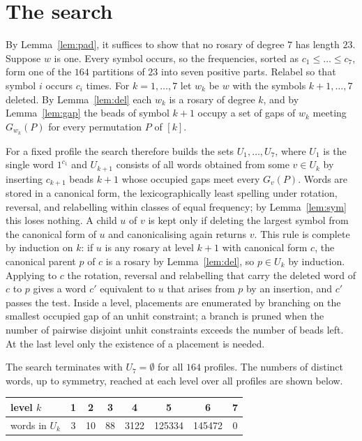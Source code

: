\documentclass[a4paper,11pt]{amsart}
\theoremstyle{remark}
\begin{document}
\section{The search}\label{sec:search}

By Lemma~\ref{lem:pad}, it suffices to show that no rosary of degree $7$ has
length $23$.  Suppose $w$ is one.  Every symbol occurs, so the frequencies,
sorted as $c_1\le\dots\le c_7$, form one of the $164$ partitions of $23$ into
seven positive parts.  Relabel so that symbol $i$ occurs $c_i$ times.  For
$k=1,\dots,7$ let $w_k$ be $w$ with the symbols $k+1,\dots,7$ deleted.  By
Lemma~\ref{lem:del} each $w_k$ is a rosary of degree $k$, and by
Lemma~\ref{lem:gap} the beads of symbol $k+1$ occupy a set of gaps of $w_k$
meeting $G_{w_k}(P)$ for every permutation $P$ of $[k]$.

For a fixed profile the search therefore builds the sets $U_1,\dots,U_7$,
where $U_1$ is the single word $1^{c_1}$ and $U_{k+1}$ consists of all words
obtained from some $v\in U_k$ by inserting $c_{k+1}$ beads $k+1$ whose
occupied gaps meet every $G_v(P)$.  Words are stored in a canonical form,
the lexicographically least spelling under rotation, reversal, and
relabelling within classes of equal frequency; by Lemma~\ref{lem:sym} this
loses nothing.  A child $u$ of $v$ is kept only if deleting the largest
symbol from the canonical form of $u$ and canonicalising again returns $v$.
This rule is complete by induction on $k$: if $u$ is any rosary at level
$k+1$ with canonical form $c$, the canonical parent $p$ of $c$ is a rosary by
Lemma~\ref{lem:del}, so $p\in U_k$ by induction.  Applying to $c$ the
rotation, reversal and relabelling that carry the deleted word of $c$ to $p$
gives a word $c'$ equivalent to $u$ that arises from $p$ by an insertion, and
$c'$ passes the test.  Inside a level, placements are enumerated by
branching on the smallest occupied gap of an unhit constraint; a branch is
pruned when the number of pairwise disjoint unhit constraints exceeds the
number of beads left.  At the last level only the existence of a placement
is needed.

The search terminates with $U_7=\emptyset$ for all $164$ profiles.  The
numbers of distinct words, up to symmetry, reached at each level over all
profiles are shown below.

\begin{center}
\begin{tabular}{lccccccc}
\toprule
level $k$ & 1 & 2 & 3 & 4 & 5 & 6 & 7\\
\midrule
words in $U_k$ & 3 & 10 & 88 & 3122 & 125334 & 145472 & 0\\
\bottomrule
\end{tabular}
\end{center}
\end{document}
